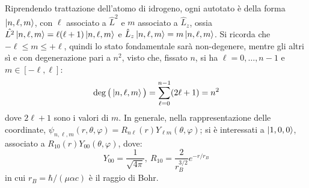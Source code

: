 \documentclass[11pt, a4paper]{scrartcl} %
\numberwithin{equation}{subsection}
\theoremstyle{style2}
\theoremstyle{style1}
\begin{document}
\begin{enumerate}[(1).]
	Riprendendo trattazione dell'atomo di idrogeno, ogni autotato \`e della forma $\ket{n,\ell ,m} $, con $\ell $ associato a $\hat{L}^2$ e $m$ associato a $\hat{L}_z$, ossia $\hat{L^2}\ket{n,\ell ,m} = \ell (\ell +1) \ket{n,\ell ,m} $ e $\hat{L}_z \ket{n,\ell ,m} = m \ket{n,\ell ,m} $. Si ricorda che $-\ell \le m \le +\ell  $, quindi lo stato fondamentale sar\`a non-degenere, mentre gli altri s\`i e con degenerazione pari a $n^2$, visto che, fissato $n$, si ha $\ell =0, \ldots, n-1$ e $m\in [-\ell ,\ell]$:
	\[
	\operatorname{deg} \big(\ket{n,\ell ,m} \big) = \sum_{\ell =0}^{n-1} (2\ell +1) = n^2
	\] 
dove $2\ell +1$	sono i valori di $m$. In generale, nella rappresentazione delle coordinate, $\psi _{n,\ell ,m} (r,\theta ,\varphi ) = R_{n\ell } (r) Y_{\ell m} (\theta ,\varphi )$; si \`e interessati a $\ket{1,0,0} $, associato a $R_{10 } (r) Y_{00} (\theta ,\varphi )$, dove:
\[
Y_{00} = \frac{1}{\sqrt{4\pi} }, \ R_{10} = \frac{2}{r_B^{3 / 2} }e ^{ - r / r_B} 
\] 
in cui $r_B=\hbar  / (\mu  \alpha  c)$ \`e il raggio di Bohr.


\end{enumerate}
\end{document}
